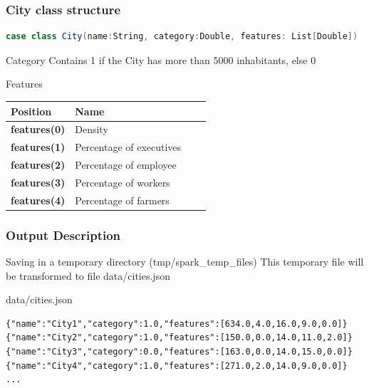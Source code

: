 \documentclass[slidetop,9pt,utf8]{beamer}
\begin{document}
\begin{frame}[fragile]

  \frametitle{City class structure}

  \begin{lstlisting}[label=CityClassOverview, caption=psug.hands.on.exercise05.City class overview, language=scala, style=code]
case class City(name:String, category:Double, features: List[Double])
  \end{lstlisting}

  \begin{block}{Category}
    Contains 1 if the City has more than 5000 inhabitants, else 0
  \end{block}

  \begin{block}{Features}
    \begin{center}
      \begin{tabular}{|l|l|l|l|}
            \hline 
            \rowcolor{gray} \textbf{Position} & \textbf{Name} \\ \hline
            \textbf{features(0)} & Density \\ \hline
            \textbf{features(1)} & Percentage of executives \\ \hline
            \textbf{features(2)} & Percentage of employee \\ \hline
            \textbf{features(3)} & Percentage of workers \\ \hline
            \textbf{features(4)} & Percentage of farmers \\ \hline
      \end{tabular}
    \end{center}
  \end{block}

\end{frame}

\begin{frame}[fragile]

  \frametitle{Output Description}
  
  \begin{block}{Saving in a temporary directory (tmp/spark\_temp\_files)}
    This temporary file will be transformed to file data/cities.json
  \end{block}


  \begin{block}{data/cities.json}
    \begin{verbatim}
{"name":"City1","category":1.0,"features":[634.0,4.0,16.0,9.0,0.0]}
{"name":"City2","category":1.0,"features":[150.0,0.0,14.0,11.0,2.0]}
{"name":"City3","category":0.0,"features":[163.0,0.0,14.0,15.0,0.0]}
{"name":"City4","category":1.0,"features":[271.0,2.0,14.0,9.0,0.0]}
...
    \end{verbatim}
  \end{block}

\end{frame}
\end{document}
